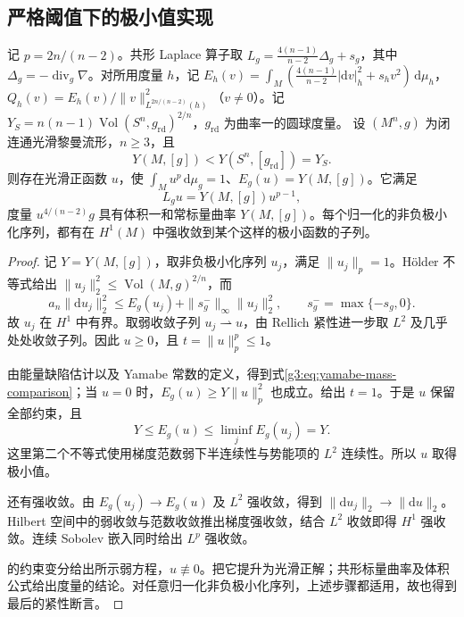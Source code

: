 \subsection{严格阈值下的极小值实现}
\label{g3:subsec:2404:04}
\begin{theorem}\label{g3:thm:yamabe-below-sphere}
	记 \(p=2n/(n-2)\)。共形 Laplace 算子取 \(L_g=\tfrac{4(n-1)}{n-2}\Delta_g+s_g\)，其中 \(\Delta_g=-\operatorname{div}_g\nabla\)。对所用度量 \(h\)，记 \(E_h(v)=\int_M(\tfrac{4(n-1)}{n-2}|\mathrm dv|_h^2+s_hv^2)\,\mathrm d\mu_h\)，\(Q_h(v)=E_h(v)/\|v\|_{L^{2n/(n-2)}(h)}^2\)（\(v\ne0\)）。记 \(Y_S=n(n-1)\operatorname{Vol}(S^n,g_{\mathrm{rd}})^{2/n}\)，\(g_{\mathrm{rd}}\) 为曲率一的圆球度量。
	设 \((M^n,g)\) 为闭连通光滑黎曼流形，\(n\ge3\)，且
	\[
		Y(M,[g])<Y(S^n,[g_{\mathrm{rd}}])=Y_S.
	\]
	则存在光滑正函数 \(u\)，使 \(\int_Mu^p\,\mathrm d\mu_g=1\)、\(E_g(u)=Y(M,[g])\)。它满足
	\[
		L_gu=Y(M,[g])u^{p-1},
	\]
	度量 \(u^{4/(n-2)}g\) 具有体积一和常标量曲率 \(Y(M,[g])\)。每个归一化的非负极小化序列，都有在 \(H^1(M)\) 中强收敛到某个这样的极小函数的子列。
\end{theorem}
\begin{proof}
	记 \(Y=Y(M,[g])\)，取非负极小化序列 \(u_j\)，满足 \(\|u_j\|_p=1\)。Hölder 不等式给出 \(\|u_j\|_2^2\le\operatorname{Vol}(M,g)^{2/n}\)，而
	\[
		a_n\|\mathrm du_j\|_2^2
		\le E_g(u_j)+\|s_g^-\|_\infty\|u_j\|_2^2,
		\qquad s_g^-=\max\{-s_g,0\}.
	\]
	故 \(u_j\) 在 \(H^1\) 中有界。取弱收敛子列 \(u_j\rightharpoonup u\)，由 Rellich 紧性进一步取 \(L^2\) 及几乎处处收敛子列。因此 \(u\ge0\)，且 \(t=\|u\|_p^p\le1\)。

	由能量缺陷估计以及 Yamabe 常数的定义，得到式\eqref{g3:eq:yamabe-mass-comparison}；当 \(u=0\) 时，\(E_g(u)\ge Y\|u\|_p^2\) 也成立。给出 \(t=1\)。于是 \(u\) 保留全部约束，且
	\[
		Y\le E_g(u)\le\liminf_jE_g(u_j)=Y.
	\]
	这里第二个不等式使用梯度范数弱下半连续性与势能项的 \(L^2\) 连续性。所以 \(u\) 取得极小值。

	还有强收敛。由 \(E_g(u_j)\to E_g(u)\) 及 \(L^2\) 强收敛，得到 \(\|\mathrm du_j\|_2\to\|\mathrm du\|_2\)。Hilbert 空间中的弱收敛与范数收敛推出梯度强收敛，结合 \(L^2\) 收敛即得 \(H^1\) 强收敛。连续 Sobolev 嵌入同时给出 \(L^p\) 强收敛。

	的约束变分给出所示弱方程，\(u\not\equiv0\)。把它提升为光滑正解；共形标量曲率及体积公式给出度量的结论。对任意归一化非负极小化序列，上述步骤都适用，故也得到最后的紧性断言。
\end{proof}

